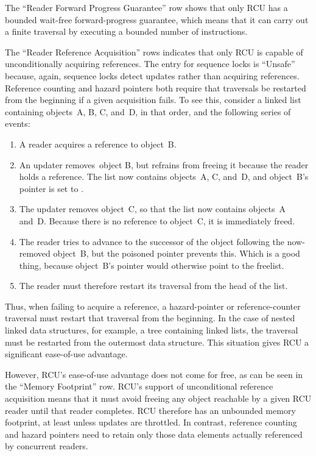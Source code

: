 The ``Reader Forward Progress Guarantee'' row shows that only RCU
has a bounded wait-free forward-progress guarantee, which means that
it can carry out a finite traversal by executing a bounded number of
instructions.

The ``Reader Reference Acquisition'' rows indicates that only RCU is
capable of unconditionally acquiring references.
The entry for sequence locks is ``Unsafe'' because, again, sequence locks
detect updates rather than acquiring references.
Reference counting and hazard pointers both require that traversals be
restarted from the beginning if a given acquisition fails.
To see this, consider a linked list containing objects~A, B, C, and~D,
in that order, and the following series of events:

\begin{enumerate}
\item	A reader acquires a reference to object~B.
\item	An updater removes~object B, but refrains from freeing it because
	the reader holds a reference.
	The list now contains objects~A, C, and~D, and
	object~B's  pointer is set to .
\item	The updater removes object~C, so that the list now contains
	objects~A and~D\@.
	Because there is no reference to object~C, it is immediately freed.
\item	The reader tries to advance to the successor of the object
	following the now-removed object~B, but the poisoned
	 pointer prevents this.
	Which is a good thing, because object~B's  pointer
	would otherwise point to the freelist.
\item	The reader must therefore restart its traversal from the head
	of the list.
\end{enumerate}

Thus, when failing to acquire a reference, a hazard-pointer or
reference-counter traversal must restart that traversal from the
beginning.
In the case of nested linked data structures, for example, a
tree containing linked lists, the traversal must be restarted from
the outermost data structure.
This situation gives RCU a significant ease-of-use advantage.

However, RCU's ease-of-use advantage does not come
for free, as can be seen in the ``Memory Footprint'' row.
RCU's support of unconditional reference acquisition means that
it must avoid freeing any object reachable by a given
RCU reader until that reader completes.
RCU therefore has an unbounded memory footprint, at least unless updates
are throttled.
In contrast, reference counting and hazard pointers need to  retain only
those data elements actually referenced by concurrent readers.

